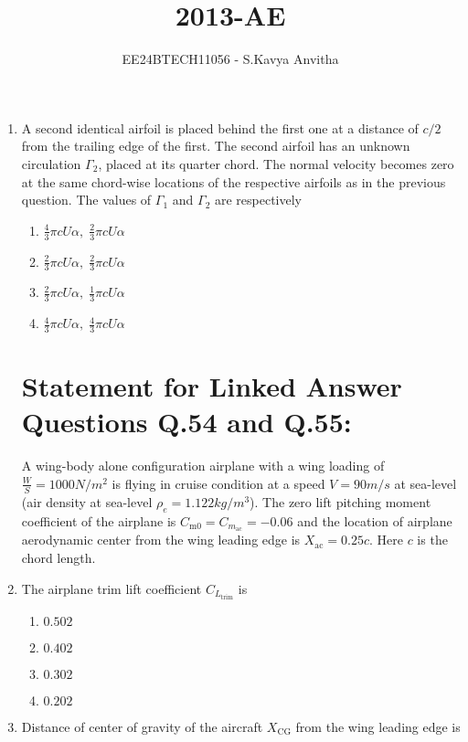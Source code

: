 \documentclass[journal]{IEEEtran}
\newcommand{\questionref}[1]{{ #1}}
\begin{document}

\vspace{3cm}

\title{2013-AE}
\author{EE24BTECH11056 - S.Kavya Anvitha}
\maketitle
\bigskip

\renewcommand{\thefigure}{\theenumi}
\renewcommand{\thetable}{\theenumi}
\begin{enumerate}

\item A second identical airfoil is placed behind the first one at a distance of $c/2$ from the trailing edge of the first. The second airfoil has an unknown circulation $\Gamma_2$, placed at its quarter chord. The normal velocity becomes zero at the same chord-wise locations of the respective airfoils as in the previous question. The values of $\Gamma_1$ and $\Gamma_2$ are respectively

\begin{enumerate}
    \item $\frac{4}{3} \pi c U \alpha, \; \frac{2}{3} \pi c U \alpha$
    \item $\frac{2}{3} \pi c U \alpha, \; \frac{2}{3} \pi c U \alpha$
    \item $\frac{2}{3} \pi c U \alpha, \; \frac{1}{3} \pi c U \alpha$
    \item $\frac{4}{3} \pi c U \alpha, \; \frac{4}{3} \pi c U \alpha$
\end{enumerate}

\section{Statement for Linked Answer Questions \questionref{Q.54} and \questionref{Q.55}:} A wing-body alone configuration airplane with a wing loading of $\frac{W}{S} = 1000N/m^2$ is flying in cruise condition at a speed $V = 90m/s$ at sea-level (air density at sea-level $\rho_e = 1.122kg/m^3$). The zero lift pitching moment coefficient of the airplane is $C_{\text{m0}} = C_{m_{\text{ac}}} = -0.06$ and the location of airplane aerodynamic center from the wing leading edge is $X_{\text{ac}} = 0.25c$. Here $c$ is the chord length.

\item \label{q54}The airplane trim lift coefficient $C_{L_{\text{trim}}}$ is

\begin{enumerate}
    \item $0.502$
    \item $0.402$
    \item $0.302$
    \item $0.202$\\
\end{enumerate}
\item \label{q55} Distance of center of gravity of the aircraft $X_{\text{CG}}$ from the wing leading edge is


\end{enumerate}
\end{document}
